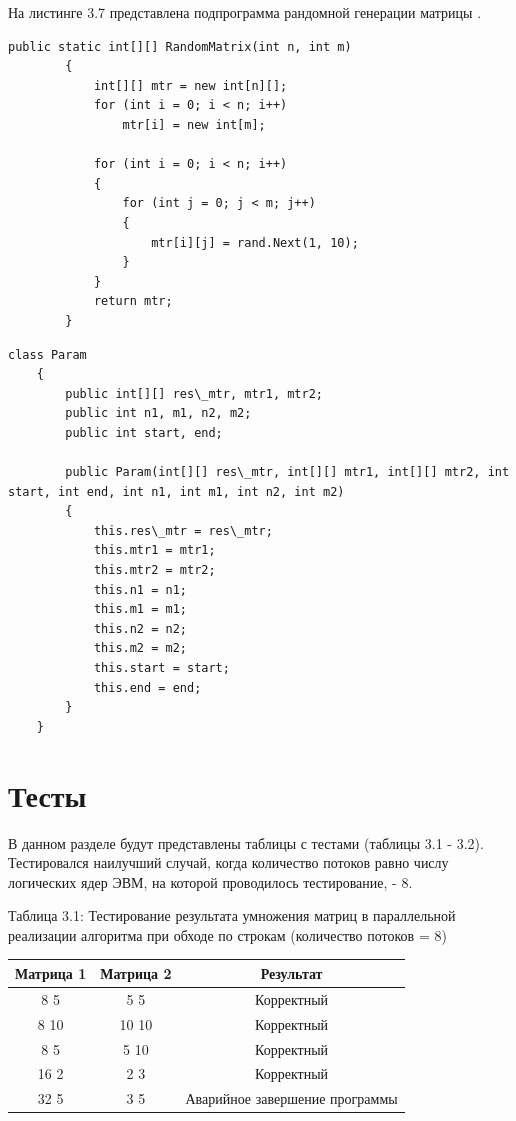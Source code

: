 \documentclass[12pt]{report}
\begin{document}
На листинге 3.7 представлена подпрограмма рандомной генерации матрицы .

\begin{lstlisting}[label=some-code,caption=Подпрограмма создания матрицы с использованием метода Next класса Random \cite{Rand}]
public static int[][] RandomMatrix(int n, int m)
        {
            int[][] mtr = new int[n][];
            for (int i = 0; i < n; i++)
                mtr[i] = new int[m];
          
            for (int i = 0; i < n; i++)
            {
                for (int j = 0; j < m; j++)
                {
                    mtr[i][j] = rand.Next(1, 10);
                }
            }
            return mtr;
        }
\end{lstlisting}

\begin{lstlisting}[label=some-code,caption=класс Param]
class Param
    {
        public int[][] res\_mtr, mtr1, mtr2;
        public int n1, m1, n2, m2;
        public int start, end;

        public Param(int[][] res\_mtr, int[][] mtr1, int[][] mtr2, int start, int end, int n1, int m1, int n2, int m2)
        {
            this.res\_mtr = res\_mtr;
            this.mtr1 = mtr1;
            this.mtr2 = mtr2;
            this.n1 = n1;
            this.m1 = m1;
            this.n2 = n2;
            this.m2 = m2;
            this.start = start;
            this.end = end;
        }
    }
\end{lstlisting}


\section{Тесты}

В данном разделе будут представлены таблицы с тестами (таблицы 3.1 - 3.2). Тестировался наилучший случай, когда количество потоков равно числу логических ядер ЭВМ, на которой проводилось тестирование, - 8.

\begin{center}
	\centering
	\caption{Таблица 3.1: Тестирование результата умножения матриц в параллельной реализации алгоритма при обходе по строкам (количество потоков = 8)}
	\begin{tabular}{|c c c|}
		\hline
		Матрица 1 & Матрица 2 &  Результат \\ [0.5ex] 
 		\hline\hline
		8 5 & 5 5 & Корректный\\
 		\hline
 		8 10 & 10 10 & Корректный\\
		\hline
		8 5 & 5 10 & Корректный\\
 		\hline
 		16 2 & 2 3 & Корректный\\
 		\hline
		32 5 & 3 5 & Аварийное завершение программы\\
		\hline
	\end{tabular}
\end{center} 
\end{document}
